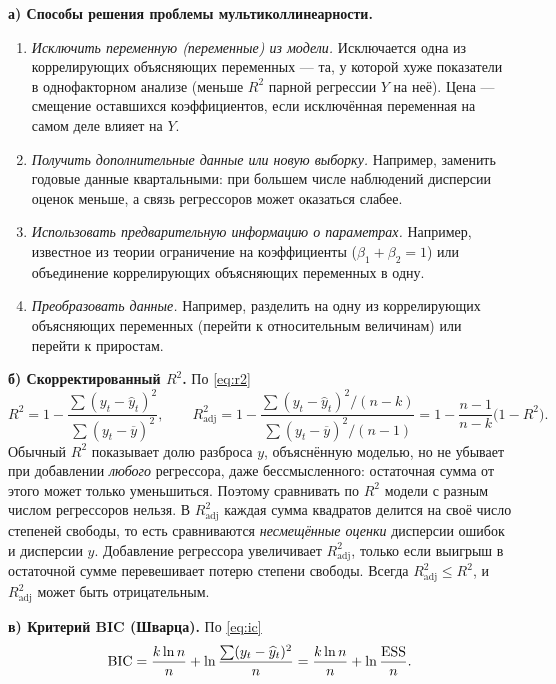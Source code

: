 \begin{solution}
\textbf{а) Способы решения проблемы мультиколлинеарности.}
\begin{enumerate}[label=\arabic*), leftmargin=2.2em, itemsep=2pt]
  \item \emph{Исключить переменную (переменные) из модели.} Исключается одна
        из коррелирующих объясняющих переменных — та, у которой хуже
        показатели в однофакторном анализе (меньше $R^2$ парной регрессии $Y$
        на неё). Цена — смещение оставшихся коэффициентов, если исключённая
        переменная на самом деле влияет на $Y$.
  \item \emph{Получить дополнительные данные или новую выборку.} Например,
        заменить годовые данные квартальными: при большем числе наблюдений
        дисперсии оценок меньше, а связь регрессоров может оказаться слабее.
  \item \emph{Использовать предварительную информацию о параметрах.} Например,
        известное из теории ограничение на коэффициенты ($\beta_1 + \beta_2 =
        1$) или объединение коррелирующих объясняющих переменных в одну.
  \item \emph{Преобразовать данные.} Например, разделить на одну из
        коррелирующих объясняющих переменных (перейти к относительным
        величинам) или перейти к приростам.
\end{enumerate}

\medskip
\textbf{б) Скорректированный $R^2$.} По \eqref{eq:r2}
\[
  R^2 = 1 - \frac{\sum(y_t - \widehat{y}_t)^2}{\sum(y_t - \overline{y})^2},
  \qquad
  R^2_{\text{adj}} = 1 - \frac{\sum(y_t - \widehat{y}_t)^2/(n-k)}{\sum(y_t - \overline{y})^2/(n-1)}
                   = 1 - \frac{n-1}{n-k}\bigl(1 - R^2\bigr).
\]
Обычный $R^2$ показывает долю разброса $y$, объяснённую моделью, но не
убывает при добавлении \emph{любого} регрессора, даже бессмысленного:
остаточная сумма от этого может только уменьшиться. Поэтому сравнивать по
$R^2$ модели с разным числом регрессоров нельзя. В $R^2_{\text{adj}}$ каждая
сумма квадратов делится на своё число степеней свободы, то есть сравниваются
\emph{несмещённые оценки} дисперсии ошибок и дисперсии $y$. Добавление
регрессора увеличивает $R^2_{\text{adj}}$, только если выигрыш в остаточной
сумме перевешивает потерю степени свободы. Всегда $R^2_{\text{adj}} \le R^2$,
и $R^2_{\text{adj}}$ может быть отрицательным.

\medskip
\textbf{в) Критерий BIC (Шварца).} По \eqref{eq:ic}
\[
  \mathrm{BIC} = \frac{k\ln n}{n} + \ln\frac{\sum(y_t - \widehat{y}_t)^2}{n}
               = \frac{k\ln n}{n} + \ln\frac{\mathrm{ESS}}{n}.
\]


\end{solution}
